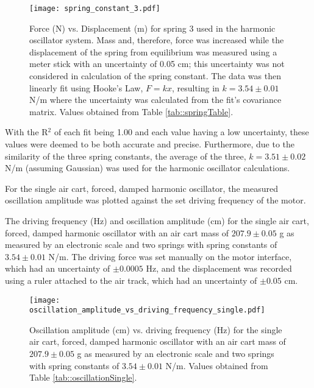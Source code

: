 \begin{figure}[H]
    \centering
	\texttt{[image: spring\_constant\_3.pdf]}
	\label{fig::spring3}
	\caption{Force (N) vs. Displacement (m) for spring 3 used in the harmonic oscillator system. Mass and, therefore, force was increased while the displacement of the spring from equilibrium was measured using a meter stick with an uncertainty of 0.05 cm; this uncertainty was not considered in calculation of the spring constant. The data was then linearly fit using Hooke's Law, $F = kx$, resulting in $k = 3.54 \pm 0.01$ N/m where the uncertainty was calculated from the fit's covariance matrix. Values obtained from Table \ref{tab::springTable}.}
\end{figure}

With the R$^2$ of each fit being 1.00 and each value having a low uncertainty, these values were deemed to be both accurate and precise. Furthermore, due to the similarity of the three spring constants, the average of the three, $k = 3.51 \pm 0.02$ N/m (assuming Gaussian) was used for the harmonic oscillator calculations.

\newpage
For the single air cart, forced, damped harmonic oscillator, the measured oscillation amplitude was plotted against the set driving frequency of the motor.

\begin{table}[H]
	\centering
	
	\caption{The driving frequency (Hz) and oscillation amplitude (cm) for the single air cart, forced, damped harmonic oscillator with an air cart mass of $207.9 \pm 0.05$ g as measured by an electronic scale and two springs with spring constants of $3.54 \pm 0.01$ N/m. The driving force was set manually on the motor interface, which had an uncertainty of $\pm 0.0005$ Hz, and the displacement was recorded using a ruler attached to the air track, which had an uncertainty of $\pm 0.05$ cm.}
	\label{tab::oscillationSingle}
\end{table}

\begin{figure}[H]
    \centering
	\texttt{[image: oscillation\_amplitude\_vs\_driving\_frequency\_single.pdf]}
	\label{fig::resonanceSingle}
	\caption{Oscillation amplitude (cm) vs. driving frequency (Hz) for the single air cart, forced, damped harmonic oscillator with an air cart mass of $207.9 \pm 0.05$ g as measured by an electronic scale and two springs with spring constants of $3.54 \pm 0.01$ N/m. Values obtained from Table \ref{tab::oscillationSingle}.}
\end{figure}

